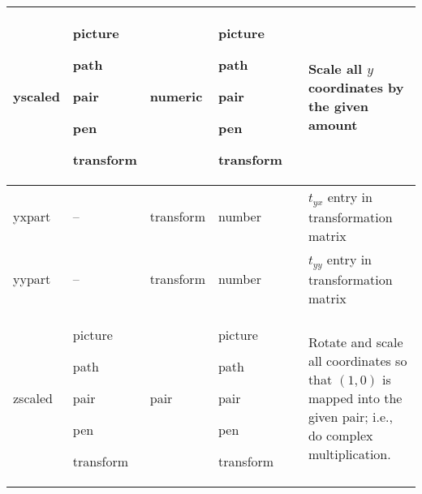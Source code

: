 \begin{longtable}{|>{\raggedright{}\ttfamily}p{.793in}*{3}{|>{\raggedright}p{.715in}}|>{\raggedleft}p{1.5em}|>{\raggedright\arraybackslash}X|}
yscaled&  picture\par path\par pair\par pen\par transform&  numeric&  picture\par path\par pair\par pen\par transform&  \pageref{Dtranop}&  Scale all $y$ coordinates by the given amount\\\hline
yxpart&  --&  transform&  number&  \pageref{Dtrprt}&  $t_{yx}$ entry in transformation matrix\\\hline
yypart&  --&  transform&  number&  \pageref{Dtrprt}&  $t_{yy}$ entry in transformation matrix\\\hline
zscaled&  picture\par path\par pair\par pen\par transform&  pair&  picture\par path\par pair\par pen\par transform&  \pageref{Dtranop}&  Rotate and scale all coordinates so that $(1,0)$ is mapped into the given pair; i.e., do complex multiplication.\\\hline
\end{longtable}

